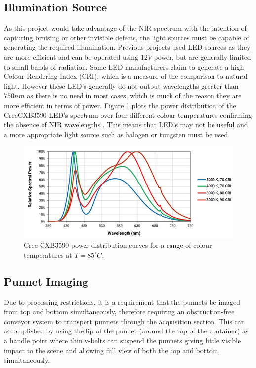 \documentclass[fleqn,twoside,12pt]{report}
\begin{document}
\subsection{Illumination Source}

As this project would take advantage of the NIR spectrum with the intention of capturing bruising or other invisible defects, the light sources must be capable of generating the required illumination. Previous projects used LED sources as they are more efficient and can be operated using $12V$ power, but are generally limited to small bands of radiation. Some LED manufacturers claim to generate a high Colour Rendering Index (CRI), which is a measure of the comparison to natural light. However these LED's generally do not output wavelengths greater than $750nm$ as there is no need in most cases, which is much of the reason they are more efficient in terms of power. Figure \ref{fig:LED_response} plots the power distribution of the Cree\textregistered CXB3590 LED's spectrum over four different colour temperatures confirming the absence of NIR wavelengths \cite{led_power}. This means that LED's may not be useful and a more appropriate light source such as halogen or tungsten must be used.


\begin{figure}[h]
	\centering
	\includegraphics[width=.9\linewidth]{LED_response.png}
	\caption{Cree CXB3590 power distribution curves for a range of colour temperatures at $T=85^{\circ}C$.}
	\label{fig:LED_response}
\end{figure}%





\subsection{Punnet Imaging}

Due to processing restrictions, it is a requirement that the punnets be imaged from top and bottom simultaneously, therefore requiring an obstruction-free conveyor system to transport punnets through the acquisition section. This can accomplished by using the lip of the punnet (around the top of the container) as a handle point where thin v-belts can suspend the punnets giving little visible impact to the scene and allowing full view of both the top and bottom, simultaneously.
\end{document}
